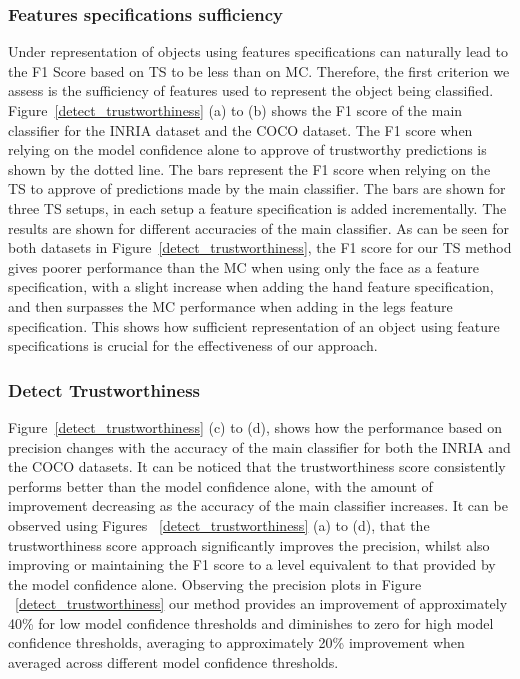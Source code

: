 %
\subsubsection{Features specifications sufficiency}
Under representation of objects using features specifications can naturally lead to the F1 Score based on TS to be less than on MC. Therefore, the first criterion we assess is the sufficiency of features used to represent the object being classified.
%
Figure~\ref{detect_trustworthiness} (a) to (b) shows the F1 score of the main classifier for the INRIA dataset and the COCO dataset. The F1 score when relying on the model confidence alone to approve of trustworthy predictions is shown by the dotted line. The bars represent the F1 score when relying on the TS to approve of predictions made by the main classifier. The bars are shown for three TS setups, in each setup a feature specification is added incrementally. 
%
The results are shown for different accuracies of the main classifier. 
%
As can be seen for both datasets in Figure~\ref{detect_trustworthiness}, the F1 score for our TS method gives poorer performance than the MC when using only the face as a feature specification, with a slight increase when adding the hand feature specification, and then surpasses the MC performance when adding in the legs feature specification. 
%
This shows how sufficient representation of an object using feature specifications is crucial for the effectiveness of our approach.


 

\subsubsection{Detect Trustworthiness}
Figure~\ref{detect_trustworthiness} (c) to (d), shows how the performance based on precision changes with the accuracy of the main classifier for both the INRIA and the COCO datasets. It can be noticed that the trustworthiness score consistently performs better than the model confidence alone, with the amount of improvement decreasing as the accuracy of the main classifier increases. 
%
It can be observed using Figures ~\ref{detect_trustworthiness} (a) to (d), that the trustworthiness score approach significantly improves the precision, whilst also improving or maintaining the F1 score to a level equivalent to that provided by the model confidence alone.  
%
Observing the precision plots in Figure ~\ref{detect_trustworthiness} our method provides an improvement of approximately 40\% for low model confidence thresholds and diminishes to zero for high model confidence thresholds, averaging to approximately 20\% improvement when averaged across different model confidence thresholds.


